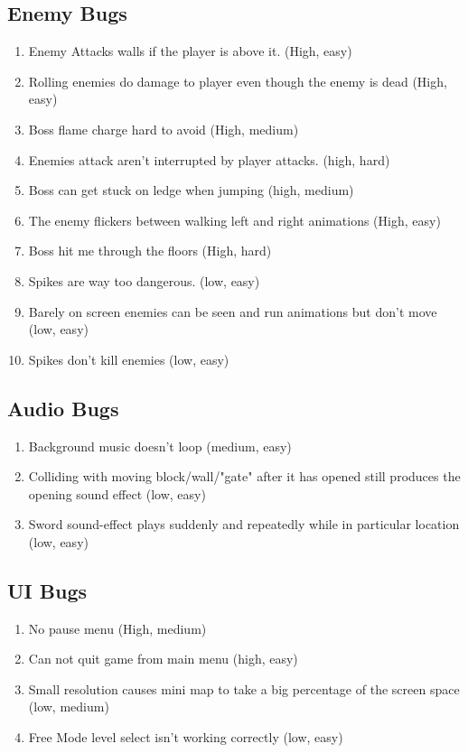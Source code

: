 \documentclass{article}
\begin{document}
\subsection*{Enemy Bugs}
\begin{enumerate}
	\item Enemy Attacks walls if the player is above it. (High, easy)
		\item Rolling enemies do damage to player even though the enemy is dead (High, easy)
			\item Boss flame charge  hard to avoid (High, medium)
				\item Enemies attack aren't interrupted by player attacks.  (high, hard)
					\item Boss can get stuck on ledge when jumping (high, medium)
						\item The enemy flickers between walking left and right animations  (High, easy)
							\item Boss hit me through the floors  (High, hard)
								\item Spikes are way too dangerous. (low, easy)
									\item Barely on screen enemies can be seen and run animations but don't move (low, easy)
										\item Spikes don't kill enemies (low, easy)
										
\end{enumerate}
\subsection*{Audio Bugs}
\begin{enumerate}
	\item Background music doesn't loop (medium, easy)
		\item Colliding with moving block/wall/"gate" after it has opened still produces the opening sound effect (low, easy)
			\item Sword sound-effect plays suddenly and repeatedly while in particular location (low, easy)
\end{enumerate}
\subsection*{UI Bugs}
\begin{enumerate}
		\item No pause menu (High, medium)
			\item Can not quit game from main menu (high, easy)
				\item Small resolution causes mini map to take a big percentage of the screen space (low, medium)
					\item Free Mode level select isn't working correctly (low, easy)
				
\end{enumerate}
\end{document}
